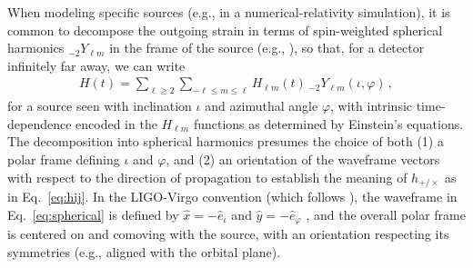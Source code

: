 \documentclass[aps,prd,twocolumn,superscriptaddress,preprintnumbers,floatfix,nofootinbib]{revtex4-2}
\newcommand*{\eq}[1]{Eq.~\eqref{eq:#1}}
\begin{document}
When modeling specific sources (e.g., in a numerical-relativity simulation), it is common to decompose the outgoing strain in terms of spin-weighted spherical harmonics ${}_{-2} Y_{\ell m}$ in the frame of the source (e.g., \cite{Kidder:2007rt}), so that, for a detector infinitely far away, we can write
\begin{align} \label{eq:spherical}
H(t) = \sum_{\ell \geq 2} \sum_{-\ell \leq m \leq \ell} H_{\ell m}(t)\, {}_{-2}Y_{\ell m} (\iota, \varphi)\, ,
\end{align}
for a source seen with inclination $\iota$ and azimuthal angle $\varphi$, with intrinsic time-dependence encoded in the $H_{\ell m}$ functions as determined by Einstein's equations.
The decomposition into spherical harmonics presumes the choice of both (1) a polar frame defining $\iota$ and $\varphi$, and (2) an orientation of the waveframe vectors with respect to the direction of propagation to establish the meaning of $h_{+/\times}$ as in \eq{hij}.
In the LIGO-Virgo convention (which follows \cite{Blanchet:2008je,Faye:2012we}), the waveframe in \eq{spherical} is defined by $\hat{x} = -\hat{e}_\iota$ and $\hat{y} = - \hat{e}_\varphi$ \cite{LALSuite:source}, and the overall polar frame is centered on and comoving with the source, with an orientation respecting its symmetries (e.g., aligned with the orbital plane).
\end{document}

